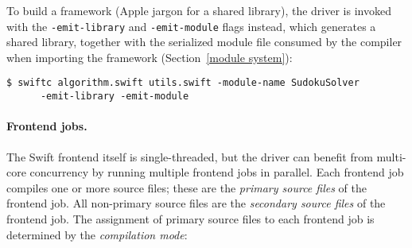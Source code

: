 \documentclass[../generics]{subfiles}
\begin{document}
To build a framework (Apple jargon for a shared library), the driver is invoked with the \texttt{-emit-library} and \texttt{-emit-module} flags instead, which generates a shared library, together with the serialized module file consumed by the compiler when importing the framework (Section~\ref{module system}):
\begin{Verbatim}
$ swiftc algorithm.swift utils.swift -module-name SudokuSolver
      -emit-library -emit-module
\end{Verbatim}

\paragraph{Frontend jobs.}
The Swift frontend itself is single-threaded, but the driver can benefit from multi-core concurrency by running multiple frontend jobs in parallel. Each frontend job compiles one or more source files; these are the \emph{primary source files} of the frontend job. All non-primary source files are the \emph{secondary source files} of the frontend job. The assignment of primary source files to each frontend job is determined by the \emph{compilation mode}:
\end{document}
